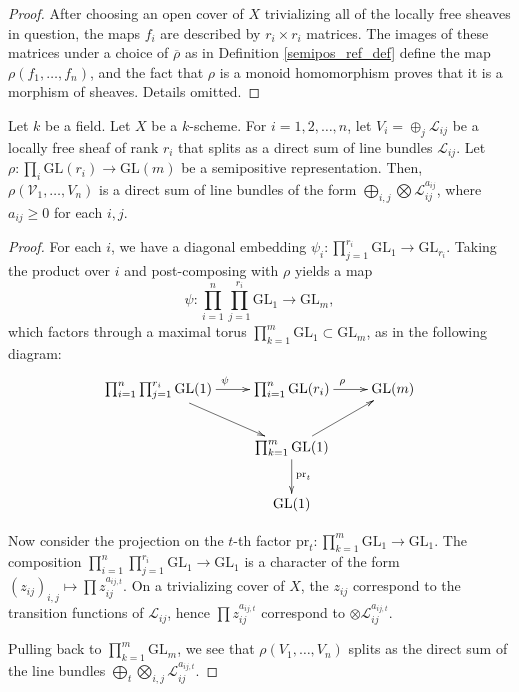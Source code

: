 \begin{proof}
After choosing an open cover of $X$ trivializing all of the locally free
sheaves in question, the maps $f_i$ are described by $r_i\times r_i$ matrices.
The images of these matrices under a choice of $\overline{\rho}$ as in
Definition \ref{semipos_ref_def} define the map $\rho(f_1,\ldots,f_n)$, and the
fact that $\rho$ is a monoid homomorphism proves that it is a morphism of
sheaves.
Details omitted.
\end{proof}

\begin{lemma}\label{rho_of_split_bundle}
Let $k$ be a field.
Let $X$ be a $k$-scheme.
For $i=1,2,\ldots,n$, let $V_i=\oplus_{j}\mathcal{L}_{ij}$ be a locally free
sheaf of rank $r_i$ that splits as a direct sum of line bundles
$\mathcal{L}_{ij}$.
Let $\rho:\prod_{i}\mathrm{GL}(r_i)\to \mathrm{GL}(m)$ be a semipositive
representation.
Then, $\rho(\mathcal{V}_1,\ldots,V_n)$ is a direct sum of line bundles of the
form $\bigoplus_{i,j}\bigotimes\mathcal{L}_{ij}^{a_{ij}}$, where $a_{ij}\ge0$ for
each $i,j$.
\end{lemma}

\begin{proof}
For each $i$, we have a diagonal embedding
$\psi_i : \prod_{j = 1}^{r_i}\mathrm{GL}_1 \to \mathrm{GL}_{r_i}$.
Taking the product over $i$ and post-composing with $\rho$ yields a map
$$
  \psi : \prod_{i = 1}^n \prod_{j = 1}^{r_i} \mathrm{GL}_1 \to \mathrm{GL}_m,
$$
which factors through a maximal torus
$\prod_{k = 1}^m \mathrm{GL}_1 \subset \mathrm{GL}_m$,
as in the following diagram:
$$
\xymatrix{
\prod_{i=1}^{n}\prod_{j=1}^{r_i} \mathrm{GL}(1)\ar[r]^{\psi} \ar[rd] &\prod_{i=1}^{n}\mathrm{GL}(r_i)\ar[r]^{\rho} &\mathrm{GL}(m)\\
&\prod_{k=1}^{m}\mathrm{GL}(1)\ar[ru]\ar[d]^{\mathrm{pr}_t}&\\
&\mathrm{GL}(1)&
}
$$

Now consider the projection on the $t$-th factor
$\mathrm{pr}_t : \prod_{k = 1}^m \mathrm{GL}_1\to \mathrm{GL}_1$.
The composition
$\prod_{i = 1}^n \prod_{j = 1}^{r_i} \mathrm{GL}_1\to \mathrm{GL}_1$ is a
character of the form $(z_{ij})_{i,j}\mapsto \prod z_{ij}^{a_{ij,t}}$.
On a trivializing cover of $X$, the $z_{ij}$ correspond to the transition
functions of $\mathcal{L}_{ij}$, hence $\prod z_{ij}^{a_{ij,t}}$ correspond to
$\otimes\mathcal{L}_{ij}^{a_{ij,t}}$.

Pulling back to $\prod_{k = 1}^m \mathrm{GL}_m$,
we see that $\rho(V_1,\ldots,V_n)$ splits as the direct sum of the line bundles
$\bigoplus_t \bigotimes_{i,j} \mathcal{L}_{ij}^{a_{ij,t}}$.
\end{proof}

